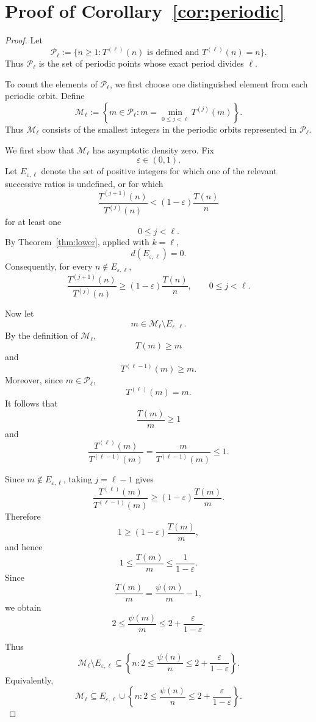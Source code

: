 \documentclass{article}
\begin{document}
\section{Proof of Corollary~\ref{cor:periodic}}

\begin{proof}
Let
\[
\mathcal P_\ell
:=
\{n\ge1:T^{(\ell)}(n)\text{ is defined and }T^{(\ell)}(n)=n\}.
\]
Thus $\mathcal P_\ell$ is the set of periodic points whose exact
period divides $\ell$.

To count the elements of $\mathcal P_\ell$, we first choose one
distinguished element from each periodic orbit. Define
\[
\mathcal M_\ell
:=
\left\{
m\in\mathcal P_\ell:
m=\min_{0\le j<\ell}T^{(j)}(m)
\right\}.
\]
Thus $\mathcal M_\ell$ consists of the smallest integers in the
periodic orbits represented in $\mathcal P_\ell$.

We first show that $\mathcal M_\ell$ has asymptotic density zero.
Fix
\[
\varepsilon\in(0,1).
\]
Let $E_{\varepsilon,\ell}$ denote the set of positive integers for
which one of the relevant successive ratios is undefined, or for
which
\[
\frac{T^{(j+1)}(n)}{T^{(j)}(n)}
<
(1-\varepsilon)\frac{T(n)}n
\]
for at least one
\[
0\le j<\ell.
\]
By Theorem~\ref{thm:lower}, applied with $k=\ell$,
\[
d(E_{\varepsilon,\ell})=0.
\]
Consequently, for every $n\notin E_{\varepsilon,\ell}$,
\[
\frac{T^{(j+1)}(n)}{T^{(j)}(n)}
\ge
(1-\varepsilon)\frac{T(n)}n,
\qquad
0\le j<\ell.
\]

Now let
\[
m\in
\mathcal M_\ell\setminus E_{\varepsilon,\ell}.
\]
By the definition of $\mathcal M_\ell$,
\[
T(m)\ge m
\]
and
\[
T^{(\ell-1)}(m)\ge m.
\]
Moreover, since $m\in\mathcal P_\ell$,
\[
T^{(\ell)}(m)=m.
\]
It follows that
\[
\frac{T(m)}m\ge1
\]
and
\[
\frac{T^{(\ell)}(m)}
{T^{(\ell-1)}(m)}
=
\frac{m}{T^{(\ell-1)}(m)}
\le1.
\]

Since $m\notin E_{\varepsilon,\ell}$, taking $j=\ell-1$ gives
\[
\frac{T^{(\ell)}(m)}
{T^{(\ell-1)}(m)}
\ge
(1-\varepsilon)\frac{T(m)}m.
\]
Therefore
\[
1
\ge
(1-\varepsilon)\frac{T(m)}m,
\]
and hence
\[
1
\le
\frac{T(m)}m
\le
\frac1{1-\varepsilon}.
\]
Since
\[
\frac{T(m)}m
=
\frac{\psi(m)}m-1,
\]
we obtain
\[
2
\le
\frac{\psi(m)}m
\le
2+\frac{\varepsilon}{1-\varepsilon}.
\]

Thus
\[
\mathcal M_\ell\setminus E_{\varepsilon,\ell}
\subseteq
\left\{
n:
2\le\frac{\psi(n)}n
\le
2+\frac{\varepsilon}{1-\varepsilon}
\right\}.
\]
Equivalently,
\[
\mathcal M_\ell
\subseteq
E_{\varepsilon,\ell}
\cup
\left\{
n:
2\le\frac{\psi(n)}n
\le
2+\frac{\varepsilon}{1-\varepsilon}
\right\}.
\]


\end{proof}
\end{document}
